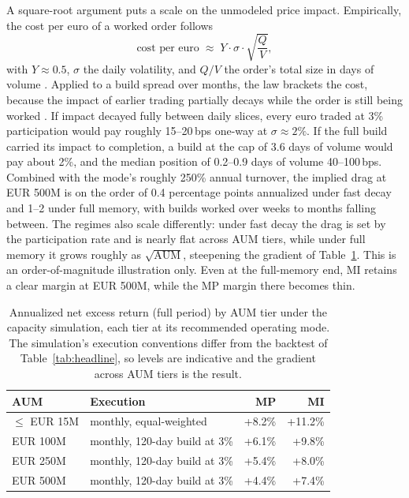 \documentclass[11pt,a4paper]{article}
\begin{document}
A square-root argument puts a scale on the unmodeled price impact.
Empirically, the cost per euro of a worked order follows
\[
  \text{cost per euro} \;\approx\; Y \cdot \sigma \cdot \sqrt{\frac{Q}{V}},
\]
with $Y \approx 0.5$, $\sigma$ the daily volatility, and $Q/V$ the order's
total size in days of volume \citep{toth2011}.
Applied to a build spread over months, the law brackets the cost, because
the impact of earlier trading partially decays while the order is still
being worked \citep{bouchaud2004}. If impact
decayed fully between daily slices, every euro traded at 3\% participation
would pay roughly 15--20\,bps one-way at $\sigma \approx 2\%$. If the full
build carried its impact to completion, a build at the cap of 3.6 days of
volume would pay about 2\%, and the median position of 0.2--0.9 days of
volume 40--100\,bps. Combined with the mode's roughly 250\% annual
turnover, the implied drag at EUR 500M is on the order of 0.4 percentage
points annualized under fast decay and 1--2 under full memory, with builds
worked over weeks to months falling between. The regimes also scale
differently: under fast decay the drag is set by the participation rate
and is nearly flat across AUM tiers, while under full memory it grows
roughly as $\sqrt{\mathrm{AUM}}$, steepening the gradient of
Table~\ref{tab:capacity}. This is an order-of-magnitude illustration only.
Even at the full-memory end, MI retains a clear margin at EUR 500M, while
the MP margin there becomes thin.

\begin{table}[t]
\centering
\small
\begin{tabular}{llrr}
\toprule
AUM & Execution & MP & MI \\
\midrule
$\leq$ EUR 15M & monthly, equal-weighted & +8.2\% & +11.2\% \\
EUR 100M & monthly, 120-day build at 3\% & +6.1\% & +9.8\% \\
EUR 250M & monthly, 120-day build at 3\% & +5.4\% & +8.0\% \\
EUR 500M & monthly, 120-day build at 3\% & +4.4\% & +7.4\% \\
\bottomrule
\end{tabular}
\caption{Annualized net excess return (full period) by AUM tier under the
capacity simulation, each tier at its recommended operating mode. The
simulation's execution conventions differ from the backtest of
Table~\ref{tab:headline}, so levels are indicative and the gradient across
AUM tiers is the result.}
\label{tab:capacity}
\end{table}
\end{document}
